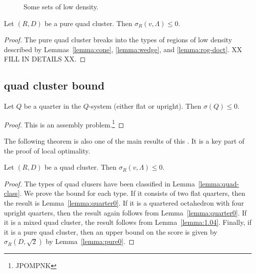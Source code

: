\begin{figure}[htb]
  \centering
  \caption{Some sets of low density.}
  \label{fig:doct}
\end{figure}

\begin{lemma}\label{lemma:pure0}
Let $(R,D)$ be a pure quad cluster.  Then
  $\sigma_R(v,\Lambda)\le 0$.
\end{lemma}

\begin{proof}  The pure quad cluster breaks into the types
of regions of low density described by Lemmas~\ref{lemma:cone},
\ref{lemma:wedge}, and \ref{lemma:rog-doct}.  XX FILL IN DETAILS XX.
\end{proof}




\subsection{quad cluster bound}

\begin{lemma} \label{lemma:quarter0}
Let $Q$ be a quarter in the $Q$-system (either flat or upright).
Then $\sigma(Q)\le 0$. 
\end{lemma}

\begin{proof} This is an assembly problem.\footnote{JPOMPNK}
\end{proof}


The following theorem is also one of the main results of this
\chap. It is a key part of the proof of local optimality.


\begin{theorem}\label{lemma:quad0} Let $(R,D)$ be a quad cluster.
Then $\sigma_R(v,\Lambda)\le 0$.
\end{theorem}

\begin{proof}
The types of quad clusers have been classified in Lemma~\ref{lemma:quad-class}.
We prove the bound for each type.
If it consists of two flat quarters, then the result is
Lemma~\ref{lemma:quarter0}.  If it is a quartered octahedron with
four upright quarters, then the result again follows from
Lemma~\ref{lemma:quarter0}.  If it is a mixed quad cluster,
the result follows from Lemma~\ref{lemma:1.04}.  Finally,
if it is a pure quad cluster, then an upper bound on the score
is given by $\sigma_R(D,\sqrt2)$ by Lemma~\ref{lemma:pure0}.  
\end{proof}







